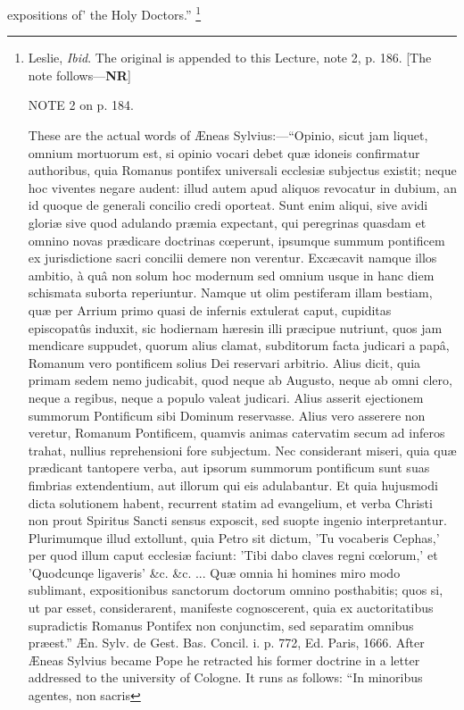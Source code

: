 expositions of' the Holy Doctors.'' \footnote{Leslie, \emph{Ibid}. The original is
appended to this Lecture, note 2, p. 186. [The note follows—\textbf{NR}]

NOTE 2
on p. 184.

These are the actual words of Æneas Sylvius:—``Opinio,
sicut jam liquet, omnium mortuorum est, si opinio vocari debet quæ
idoneis confirmatur authoribus, quia Romanus pontifex universali
ecclesiæ subjectus existit; neque hoc viventes negare audent: illud
autem apud aliquos revocatur in dubium, an id quoque de generali
concilio credi oporteat. Sunt enim aliqui, sive avidi gloriæ sive
quod adulando præmia expectant, qui peregrinas quasdam et omnino
novas prædicare doctrinas cœperunt, ipsumque summum pontificem ex
jurisdictione sacri concilii demere non verentur. Excæcavit namque
illos ambitio, à quâ non solum hoc modernum sed omnium usque in
hanc diem schismata suborta reperiuntur. Namque ut olim
pestiferam illam bestiam, quæ per Arrium primo quasi de infernis
extulerat caput, cupiditas episcopatûs induxit, sic hodiernam
hæresin illi præcipue nutriunt, quos jam mendicare suppudet, quorum
alius clamat, subditorum facta judicari a papâ, Romanum vero
pontificem solius Dei reservari arbitrio. Alius dicit, quia primam
sedem nemo judicabit, quod neque ab Augusto, neque ab omni clero,
neque a regibus, neque a populo valeat judicari. Alius asserit
ejectionem summorum Pontificum sibi Dominum reservasse. Alius vero
asserere non veretur, Romanum Pontificem, quamvis animas catervatim
secum ad inferos trahat, nullius reprehensioni fore subjectum. Nec
considerant miseri, quia quæ prædicant tantopere verba, aut ipsorum
summorum pontificum sunt suas fimbrias extendentium, aut illorum qui
eis adulabantur. Et quia hujusmodi dicta solutionem habent, recurrent
statim ad evangelium, et verba Christi non prout Spiritus Sancti
sensus exposcit, sed suopte ingenio interpretantur. Plurimumque illud
extollunt, quia Petro sit dictum, 'Tu vocaberis Cephas,' per quod
illum caput ecclesiæ faciunt: 'Tibi dabo claves regni cœlorum,' et 'Quodcunqe
ligaveris' \&c. \&c. ... Quæ omnia hi homines miro modo
sublimant, expositionibus sanctorum doctorum omnino posthabitis; quos
si, ut par esset, considerarent, manifeste cognoscerent, quia ex
auctoritatibus supradictis Romanus Pontifex non conjunctim, sed
separatim omnibus præest.'' Æn. Sylv. de Gest. Bas. Concil. i.
p. 772, Ed. Paris, 1666. After Æneas Sylvius became Pope he retracted
his former doctrine in a letter addressed to the university of
Cologne. It runs as follows: ``In minoribus agentes, non sacris
}
